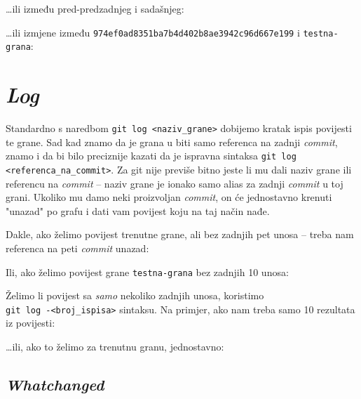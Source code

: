 
\dots{}ili između pred-predzadnjeg i sadašnjeg:


\dots{}ili izmjene između \verb+974ef0ad8351ba7b4d402b8ae3942c96d667e199+ i \verb+testna-grana+:


\section*{\emph{Log}}

Standardno s naredbom \verb+git log <naziv_grane>+ dobijemo kratak ispis povijesti te grane.
Sad kad znamo da je grana u biti samo referenca na zadnji \emph{commit}, znamo i da bi bilo preciznije kazati da je ispravna sintaksa \verb+git log <referenca_na_commit>+.
Za git nije previše bitno jeste li mu dali naziv grane ili referencu na \emph{commit} -- naziv grane je ionako samo alias za zadnji \emph{commit} u toj grani.
Ukoliko mu damo neki proizvoljan \emph{commit}, on će jednostavno krenuti "unazad" po grafu i dati vam povijest koju na taj način nađe.

Dakle, ako želimo povijest trenutne grane, ali bez zadnjih pet unosa -- treba nam referenca na peti \emph{commit} unazad:


Ili, ako želimo povijest grane \verb+testna-grana+ bez zadnjih 10 unosa:


Želimo li povijest sa \emph{samo} nekoliko zadnjih unosa, koristimo \\\verb+git log -<broj_ispisa>+ sintaksu. 
Na primjer, ako nam treba samo 10 rezultata iz povijesti:


\dots{}ili, ako to želimo za trenutnu granu, jednostavno:


\subsection*{\emph{Whatchanged}}

